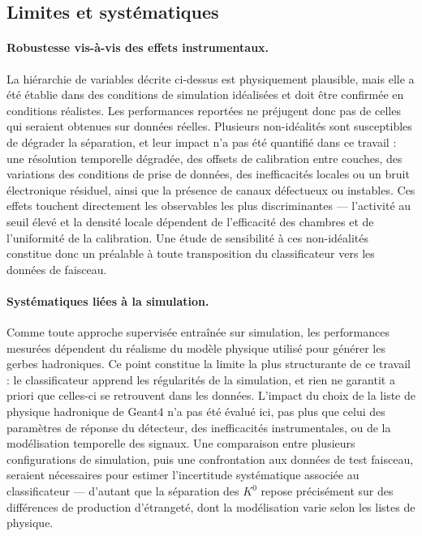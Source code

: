 \subsection{Limites et systématiques}
\label{subsec:pid-limites}

\paragraph{Robustesse vis-à-vis des effets instrumentaux.}

La hiérarchie de variables décrite ci-dessus est physiquement plausible, mais elle a été établie dans des conditions de simulation idéalisées et doit être confirmée en conditions réalistes. Les performances reportées ne préjugent donc pas de celles qui seraient obtenues sur données réelles. Plusieurs non-idéalités sont susceptibles de dégrader la séparation, et leur impact n'a pas été quantifié dans ce travail : une résolution temporelle dégradée, des offsets de calibration entre couches, des variations des conditions de prise de données, des inefficacités locales ou un bruit électronique résiduel, ainsi que la présence de canaux défectueux ou instables. Ces effets touchent directement les observables les plus discriminantes — l'activité au seuil élevé et la densité locale dépendent de l'efficacité des chambres et de l'uniformité de la calibration. Une étude de sensibilité à ces non-idéalités constitue donc un préalable à toute transposition du classificateur vers les données de faisceau.

\paragraph{Systématiques liées à la simulation.}

Comme toute approche supervisée entraînée sur simulation, les performances mesurées dépendent du réalisme du modèle physique utilisé pour générer les gerbes hadroniques. Ce point constitue la limite la plus structurante de ce travail : le classificateur apprend les régularités de la simulation, et rien ne garantit a priori que celles-ci se retrouvent dans les données. L'impact du choix de la liste de physique hadronique de Geant4 \cite{geant4update} n'a pas été évalué ici, pas plus que celui des paramètres de réponse du détecteur, des inefficacités instrumentales, ou de la modélisation temporelle des signaux. Une comparaison entre plusieurs configurations de simulation, puis une confrontation aux données de test faisceau, seraient nécessaires pour estimer l'incertitude systématique associée au classificateur — d'autant que la séparation des $K^0$ repose précisément sur des différences de production d'étrangeté, dont la modélisation varie selon les listes de physique.

